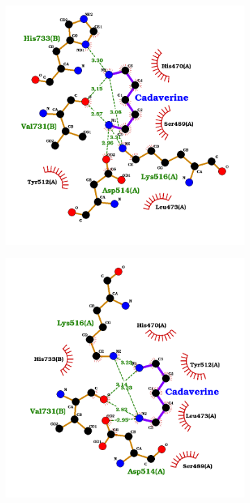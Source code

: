 \documentclass[12pt]{article}
\begin{document}
	\FloatBarrier
	\begin{figure}[h!]
		\centering
		\begin{subfigure}[h!]{0.35\textwidth}
			\hspace{2cm}
			\includegraphics[width=\textwidth]{../8/Dock/best.png}
			\caption{}
		\end{subfigure}
		\hfill
		\begin{subfigure}[h!]{0.35\textwidth}
			\hspace{-2cm}
			\includegraphics[width=\textwidth]{../8/Dock/best2.png}

\end{subfigure}
\end{figure}
\end{document}
